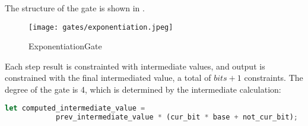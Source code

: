 The structure of the gate is shown in .
\begin{figure}[!ht]
    \centering
    \texttt{[image: gates/exponentiation.jpeg]}
    \caption{ExponentiationGate}
    \label{fig:exponetiation-gate}
\end{figure}

Each step result is constrainted with intermediate values, and output is constrained with the final intermediated value, a total of $bits + 1$ constraints.
The degree of the gate is 4, which is determined by the intermediate calculation:
\begin{lstlisting}[language=rust]
let computed_intermediate_value =
            prev_intermediate_value * (cur_bit * base + not_cur_bit);
\end{lstlisting}
